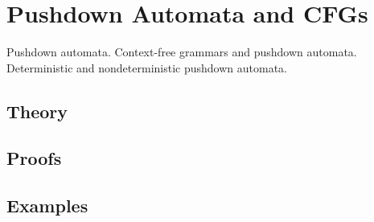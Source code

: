 
\section{Pushdown Automata and CFGs}
\label{sec:2.3a.09-pushdown-automata}

\begin{ticket}
Pushdown automata. Context-free grammars and pushdown automata. Deterministic and nondeterministic pushdown automata.
\end{ticket}

\subsection*{Theory}

\subsection*{Proofs}

\subsection*{Examples}
